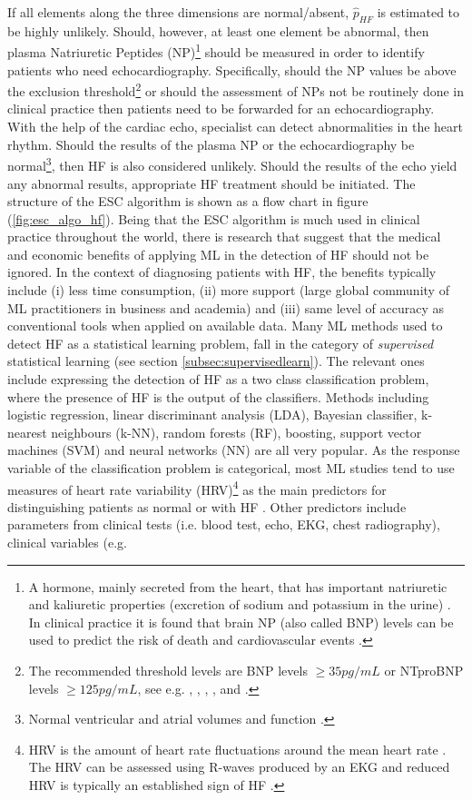 \documentclass[../thesis.tex]{subfiles}
\begin{document}
\indent If all elements along the three dimensions are normal/absent, $\hat{p}_{HF}$ is estimated to be highly unlikely. Should, however, at least one element be abnormal, then plasma Natriuretic Peptides (NP)\footnote{A hormone, mainly secreted from the heart, that has important natriuretic and kaliuretic properties (excretion of sodium and potassium in the urine) \citep{pandit2011natriuretic}. In clinical practice it is found that brain NP (also called BNP) levels can be used to predict the risk of death and cardiovascular events  \citep{wang2004plasma}.} should be measured in order to identify patients who need echocardiography. Specifically, should the NP values be above the exclusion threshold\footnote{The recommended threshold levels are BNP levels $\geq 35 pg/mL$ or NTproBNP levels $\geq 125 pg/mL$, see e.g. \cite{cowie1997value}, \cite{yamamoto2000clinical}, \cite{krishnaswamy2001utility}, \cite{zaphiriou2005diagnostic}, \cite{fuat2006diagnostic} and \cite{maisel2008state}.} or should the assessment of NPs not be routinely done in clinical practice then patients need to be forwarded for an echocardiography. With the help of the cardiac echo, specialist can detect abnormalities in the heart rhythm. Should the results of the plasma NP or the echocardiography be normal\footnote{Normal ventricular and atrial volumes and function \citep{aune2009normal}.}, then HF is also considered unlikely.  Should the results of the echo yield any abnormal results, appropriate HF treatment should be initiated. The structure of the ESC algorithm is shown as a flow chart in figure (\ref{fig:esc_algo_hf}). Being that the ESC algorithm is much used in clinical practice throughout the world, there is research that suggest that the medical and economic benefits of applying ML in the detection of HF should not be ignored. In the context of diagnosing patients with HF, the benefits typically include (i) less time consumption, (ii) more support (large global community of ML practitioners in business and academia) and (iii) same level of accuracy as conventional tools when applied on available data. Many ML methods used to detect HF as a statistical learning problem, fall in the category of \textit{supervised} statistical learning (see section \ref{subsec:supervisedlearn}). The relevant ones include expressing the detection of HF as a two class classification problem, where the presence of HF is the output of the classifiers. Methods including logistic regression, linear discriminant analysis (LDA), Bayesian classifier, k-nearest neighbours (k-NN), random forests (RF), boosting, support vector machines (SVM) and neural networks (NN) are all very popular. As the response variable of the classification problem is categorical, most ML studies tend to use measures of heart rate variability (HRV)\footnote{HRV is the amount of heart rate fluctuations around the mean heart rate \citep{van1993heart}. The HRV can be assessed using R-waves produced by an EKG and reduced HRV is typically an established sign of HF \citep{ernst2016heart}.} as the main predictors for distinguishing patients as normal or with HF \citep{tripoliti2017heart}. Other predictors include parameters from clinical tests (i.e. blood test, echo, EKG, chest radiography), clinical variables (e.g. 
\end{document}
